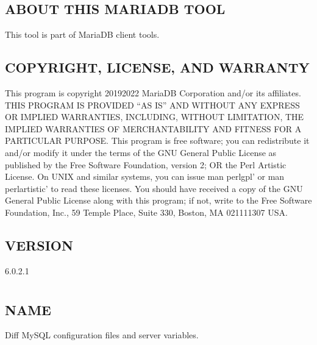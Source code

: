 \documentclass[letterpaper,10pt,english]{sphinxmanual}
\begin{document}
\section{ABOUT THIS MARIADB TOOL}
\label{\detokenize{mariadb-backup-manager:about-this-mariadb-tool}}
This tool is part of MariaDB client tools.


\section{COPYRIGHT, LICENSE, AND WARRANTY}
\label{\detokenize{mariadb-backup-manager:copyright-license-and-warranty}}
This program is copyright 2019\sphinxhyphen{}2022 MariaDB Corporation and/or its affiliates.
THIS PROGRAM IS PROVIDED “AS IS” AND WITHOUT ANY EXPRESS OR IMPLIED
WARRANTIES, INCLUDING, WITHOUT LIMITATION, THE IMPLIED WARRANTIES OF
MERCHANTABILITY AND FITNESS FOR A PARTICULAR PURPOSE.
This program is free software; you can redistribute it and/or modify it under
the terms of the GNU General Public License as published by the Free Software
Foundation, version 2; OR the Perl Artistic License.  On UNIX and similar
systems, you can issue \textasciigrave{}man perlgpl’ or \textasciigrave{}man perlartistic’ to read these
licenses.
You should have received a copy of the GNU General Public License along with
this program; if not, write to the Free Software Foundation, Inc., 59 Temple
Place, Suite 330, Boston, MA  02111\sphinxhyphen{}1307  USA.


\section{VERSION}
\label{\detokenize{mariadb-backup-manager:version}}
 6.0.2.1


\chapter{}
\label{\detokenize{mariadb-config-diff:mariadb-config-diff}}\label{\detokenize{mariadb-config-diff::doc}}

\section{NAME}
\label{\detokenize{mariadb-config-diff:name}}
 \sphinxhyphen{} Diff MySQL configuration files and server variables.
\end{document}
